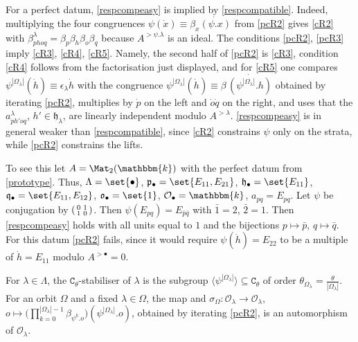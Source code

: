 \documentclass[a4paper,11pt]{amsart}
\numberwithin{equation}{subsection}
\theoremstyle{definition}
\theoremstyle{theorem}
\theoremstyle{remark}
\newcommand\CO{\mathcal{O}}
\newcommand\plam[1][\lambda]{\mathfrak{p}_{#1}}
\newcommand\hlam[1][\lambda]{\mathfrak{h}_{#1}}
\newcommand\qlam[1][\lambda]{\mathfrak{q}_{#1}}
\newcommand\Olam[1][\lambda]{\CO_{#1}}
\newcommand\olam[1][\lambda]{\mathfrak{o}_{#1}}
\newcommand\kk{\mathbbm{k}}
\begin{document}
\begin{Remark}\label{seeminglyeasier}
For a perfect datum, \autoref{respcompeasy} is implied by
\autoref{respcompatible}. Indeed, multiplying
the four congruences $\psi(\dot x)\equiv\beta_x\dot{(\psi.x)}$ from \autoref{pcR2} gives \autoref{cR2} with
$\beta^{\lambda}_{phoq}=\beta_p\beta_h\beta_o\beta_q$ because $A^{>\psi.\lambda}$ is an ideal. The conditions
\autoref{pcR2}, \autoref{pcR3} imply
\autoref{cR3}, \autoref{cR4}, \autoref{cR5}. Namely,  the second half of
\autoref{pcR2} is \autoref{cR3}, condition \autoref{cR4} follows from the
factorisation just displayed, and for \autoref{cR5} one compares
$\psi^{|\Omega_\lambda|}(\dot h)\equiv\epsilon_\lambda\dot h$ with the
congruence $\psi^{|\Omega_\lambda|}(\dot h)\equiv\beta\,
\dot{(\psi^{|\Omega_\lambda|}.h)}$ obtained by iterating \autoref{pcR2},
multiplies by $\dot p$ on the left and $\dot o\dot q$ on the right, and uses
that the $a^{\lambda}_{ph'oq}$, $h'\in\hlam$, are linearly independent modulo
$A^{>\lambda}$. \autoref{respcompeasy} is in general weaker than
\autoref{respcompatible}, since \autoref{cR2} constrains $\psi$ only on the
strata, while \autoref{pcR2} constrains the lifts.

To see this let $A=\Mat_2(\kk)$ with the perfect datum from
\autoref{prototype}. Thus,
$\Lambda=\set{\bullet}$, $\plam[\bullet]=\set{E_{11},E_{21}}$,
$\hlam[\bullet]=\set{E_{11}}$, $\qlam[\bullet]=\set{E_{11},E_{12}}$,
$\olam[\bullet]=\set{1}$, $\Olam[\bullet]=\kk$, $a_{pq}=E_{pq}$.
Let $\psi$ be conjugation by $\begin{psmallmatrix}0&1\\1&0\end{psmallmatrix}$. Then
$\psi(E_{pq})=E_{\bar p\bar q}$ with $\bar1=2$, $\bar2=1$. Then
\autoref{respcompeasy} holds with all units equal to $1$ and the bijections
$p\mapsto\bar p$, $q\mapsto\bar q$. For this datum
\autoref{pcR2} fails, since it would require
$\psi(\dot h)=E_{22}$ to be a multiple of $\dot h=E_{11}$ modulo $A^{>\bullet}=0$.
\end{Remark}

For $\lambda\in\Lambda$,  the $\mathtt{C}_\theta$-stabiliser of $\lambda$  is the subgroup
  $\langle\psi^{|\Omega_\lambda|}\rangle\subseteq\mathtt{C}_\theta$ of order
  $\theta_{\Omega_\lambda}=\frac{\theta}{|\Omega_\lambda|}$. For an orbit $\Omega$ and a fixed $\lambda\in\Omega$, the map and
  $\sigma_\Omega\colon\Olam\to\Olam$, $o\mapsto\bigl(\prod_{k=0}^{|\Omega_\lambda|-1}\beta_{\psi^{k}.o}\bigr)(\psi^{|\Omega_\lambda|}.o)$, obtained by
  iterating \autoref{pcR2}, is an automorphism of $\Olam$.
\end{document}
